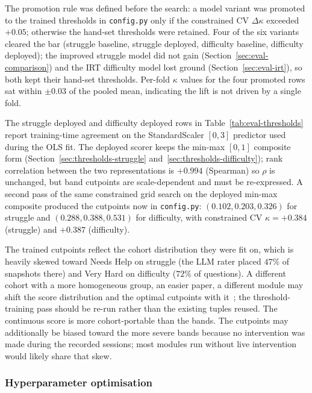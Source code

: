 The promotion rule was defined before the search: a model variant was promoted to the trained thresholds in \texttt{config.py} only if the constrained CV $\Delta\kappa$ exceeded $+0.05$; otherwise the hand-set thresholds were retained. Four of the six variants cleared the bar (struggle baseline, struggle deployed, difficulty baseline, difficulty deployed); the improved struggle model did not gain (Section~\ref{sec:eval-comparison}) and the IRT difficulty model lost ground (Section~\ref{sec:eval-irt}), so both kept their hand-set thresholds. Per-fold $\kappa$ values for the four promoted rows sat within $\pm 0.03$ of the pooled mean, indicating the lift is not driven by a single fold.

The struggle deployed and difficulty deployed rows in Table~\ref{tab:eval-thresholds} report training-time agreement on the StandardScaler $[0,3]$ predictor used during the OLS fit. The deployed scorer keeps the min-max $[0,1]$ composite form (Section~\ref{sec:thresholds-struggle} and~\ref{sec:thresholds-difficulty}); rank correlation between the two representations is $+0.994$ (Spearman) so $\rho$ is unchanged, but band cutpoints are scale-dependent and must be re-expressed. A second pass of the same constrained grid search on the deployed min-max composite produced the cutpoints now in \texttt{config.py}: $(0.102, 0.203, 0.326)$ for struggle and $(0.288, 0.388, 0.531)$ for difficulty, with constrained CV $\kappa = +0.384$ (struggle) and $+0.387$ (difficulty).

The trained cutpoints reflect the cohort distribution they were fit on, which is heavily skewed toward Needs Help on struggle (the LLM rater placed $47\%$ of snapshots there) and Very Hard on difficulty ($72\%$ of questions). A different cohort with a more homogeneous group, an easier paper, a different module may shift the score distribution and the optimal cutpoints with it~\cite{saisanaUncertaintySensitivityAnalysis2005}; the threshold-training pass should be re-run rather than the existing tuples reused. The continuous score is more cohort-portable than the bands. 
The cutpoints may additionally be biased toward the more severe bands because no intervention was made during the recorded sessions; most modules run without live intervention would likely share that skew.

\subsubsection{Hyperparameter optimisation} \label{sec:eval-hyperopt}

